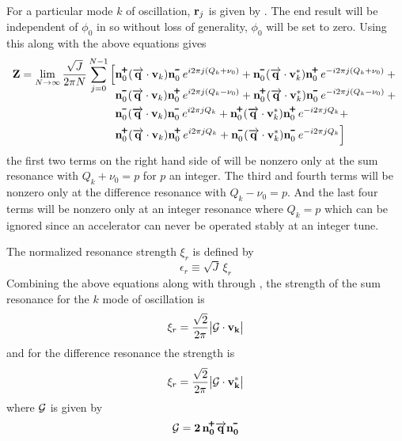 For a particular mode $k$ of oscillation, ${\bf r}_j$ is given by . The end result will be
independent of $\phi_0$ in  so without loss of generality, $\phi_0$ will be set to zero.
Using this along with the above equations gives
\begin{align}
  \bfZ = \lim_{N \rightarrow \infty} 
    \frac{\sqrt{J}}{2 \pi N} 
    \sum_{j = 0}^{N-1} \Big[
    &\bfn_0^\ppls (\arrowbfq \cdot \bfv_k)   \bfn_0^\mmin \, e^{ i2\pi j (Q_k + \nu_0)} + 
     \bfn_0^\mmin (\arrowbfq \cdot \bfv_k^*) \bfn_0^\ppls \, e^{-i2\pi j (Q_k + \nu_0)} + {} 
    \nonumber \\[-2ex]
    &\bfn_0^\mmin (\arrowbfq \cdot \bfv_k)   \bfn_0^\ppls \, e^{ i2\pi j (Q_k - \nu_0)} +
     \bfn_0^\ppls (\arrowbfq \cdot \bfv_k^*) \bfn_0^\mmin \, e^{-i2\pi j (Q_k - \nu_0)} + {}
    \label{zj2pn} \\
    &\bfn_0^\mmin (\arrowbfq \cdot \bfv_k)   \bfn_0^\mmin \, e^{i2\pi j Q_k} + 
     \bfn_0^\ppls (\arrowbfq \cdot \bfv_k^*) \bfn_0^\ppls \, e^{-i2\pi j Q_k} + \CRNO
    &\bfn_0^\ppls (\arrowbfq \cdot \bfv_k)   \bfn_0^\ppls \, e^{i2\pi j Q_k} + 
     \bfn_0^\mmin (\arrowbfq \cdot \bfv_k^*) \bfn_0^\mmin \, e^{-i2\pi j Q_k}
   \Big] \nonumber
\end{align}
the first two terms on the right hand side of  will be nonzero only at the sum resonance
with $Q_k + \nu_0 = p$ for $p$ an integer.  The third and fourth terms will be nonzero only at the
difference resonance with $Q_k - \nu_0 = p$.  And the last four terms will be nonzero only at an
integer resonance where $Q_k = p$ which can be ignored since an accelerator can never be operated
stably at an integer tune.

The normalized resonance strength $\xi_r$ is defined by
\begin{equation}
  \epsilon_r \equiv \sqrt{J} \, \xi_r
  \label{ejx}
\end{equation}
Combining the above equations along with  through , the strength of the sum
resonance for the $k$ mode of oscillation is
\begin{equation}
  \xi_r = \frac{\sqrt{2}}{2\pi} \big| \bf{\cal G} \cdot {\bf v}_k \big| 
  \label{x12pq1}
\end{equation}
and for the difference resonance the strength is
\begin{equation}
  \xi_r = \frac{\sqrt{2}}{2\pi} \big|
  \bf{\cal G} \cdot {\bf v}_k^* \big| 
  \label{x12pq2}
\end{equation}
where $\bf{\cal G}$ is given by
\begin{equation}
  \bf{\cal G} = 2 \, \bfn_0^\ppls \arrowbfq \bfn_0^\mmin
  \label{g2nqn}
\end{equation}

